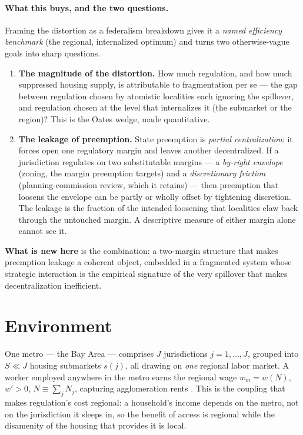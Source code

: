 \documentclass[11pt]{article}
\begin{document}
\paragraph{What this buys, and the two questions.} Framing the distortion as a federalism
breakdown gives it a \emph{named efficiency benchmark} (the regional, internalized optimum) and
turns two otherwise-vague goals into sharp questions.
\begin{enumerate}
\item \textbf{The magnitude of the distortion.} How much regulation, and how much suppressed
housing supply, is attributable to fragmentation per se --- the gap between regulation chosen by
atomistic localities each ignoring the spillover, and regulation chosen at the level that
internalizes it (the submarket or the region)? This is the Oates wedge, made quantitative.
\item \textbf{The leakage of preemption.} State preemption is \emph{partial centralization}: it
forces open one regulatory margin and leaves another decentralized. If a jurisdiction regulates
on two substitutable margins --- a \emph{by-right envelope} (zoning, the margin preemption
targets) and a \emph{discretionary friction} (planning-commission review, which it retains) ---
then preemption that loosens the envelope can be partly or wholly offset by tightening
discretion. The leakage is the fraction of the intended loosening that localities claw back
through the untouched margin. A descriptive measure of either margin alone cannot see it.
\end{enumerate}
\textbf{What is new here} is the combination: a two-margin structure that makes preemption
leakage a coherent object, embedded in a fragmented system whose strategic interaction is the
empirical signature of the very spillover that makes decentralization inefficient.

\section{Environment}\label{sec:env}

One metro --- the Bay Area --- comprises $J$ jurisdictions $j=1,\dots,J$, grouped into $S\ll J$
housing submarkets $s(j)$, all drawing on \emph{one} regional labor market. A worker employed
anywhere in the metro earns the regional wage $w_m=w(N)$, $w'>0$, $N\equiv\sum_j N_j$, capturing
agglomeration rents \citep{hsieh2019housing}. This is the coupling that makes regulation's cost
regional: a household's income depends on the metro, not on the jurisdiction it sleeps in, so the
benefit of access is regional while the disamenity of the housing that provides it is local.
\end{document}
